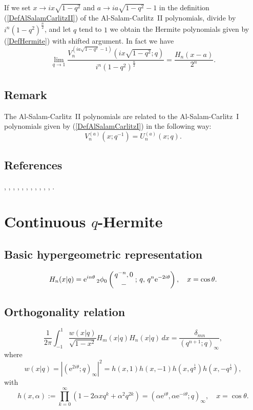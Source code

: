 \documentclass[envcountchap,graybox]{svmono}
\newcommand{\qhyp}[5]{\mbox{}_{#1}{\phi}_{#2}
\left(\genfrac{}{}{0pt}{}{#3}{#4}\,;\,q,\,#5\right)}
\newcommand{\e}{\textrm{e}}
\begin{document}
If we set $x\rightarrow ix\sqrt{1-q^2}$ and $a\rightarrow ia\sqrt{1-q^2}-1$
in the definition (\ref{DefAlSalamCarlitzII}) of the Al-Salam-Carlitz~II
polynomials, divide by $i^n(1-q^2)^{\frac{n}{2}}$, and let $q$ tend to $1$ we
obtain the Hermite polynomials given by (\ref{DefHermite}) with shifted
argument. In fact we have
\begin{equation}
\lim_{q\rightarrow 1}\frac{V_n^{(ia\sqrt{1-q^2}-1)}(ix\sqrt{1-q^2};q)}
{i^n(1-q^2)^{\frac{n}{2}}}=\frac{H_n(x-a)}{2^n}.
\end{equation}

\subsection*{Remark}
The Al-Salam-Carlitz~II polynomials are related to the Al-Salam-Carlitz~I
polynomials given by (\ref{DefAlSalamCarlitzI}) in the following way:
$$V_n^{(a)}(x;q^{-1})=U_n^{(a)}(x;q).$$

\subsection*{References}
\cite{AlSalam90}, \cite{AlSalamCarlitz}, \cite{AlSalamChihara76},
\cite{AskeySuslovI}, \cite{BergValent}, \cite{Chihara68I},
\cite{Chihara68II}, \cite{Chihara78}, \cite{Dehesa}, \cite{FlorisKoelink},
\cite{Ismail85I}, \cite{Ismail2005I}.


\section{Continuous $q$-Hermite}
\par\setcounter{equation}{0}

\subsection*{Basic hypergeometric representation}
\begin{equation}
\label{DefContqHermite}
H_n(x|q)=\e^{in\theta}\,\qhyp{2}{0}{q^{-n},0}{-}{q^n\e^{-2i\theta}},
\quad x=\cos\theta.
\end{equation}

\newpage

\subsection*{Orthogonality relation}
\begin{equation}
\label{OrtContqHermite}
\frac{1}{2\pi}\int_{-1}^1\frac{w(x|q)}{\sqrt{1-x^2}}H_m(x|q)H_n(x|q)\,dx=
\frac{\,\delta_{mn}}{(q^{n+1};q)_{\infty}},
\end{equation}
where
$$w(x|q)=\left|\left(\e^{2i\theta};q\right)_{\infty}\right|^2=h(x,1)h(x,-1)
h(x,q^{\frac{1}{2}})h(x,-q^{\frac{1}{2}}),$$
with
$$h(x,\alpha):=\prod_{k=0}^{\infty}\left(1-2\alpha xq^k+\alpha^2q^{2k}\right)
=\left(\alpha\e^{i\theta},\alpha\e^{-i\theta};q\right)_{\infty},\quad x=\cos\theta.$$
\end{document}
